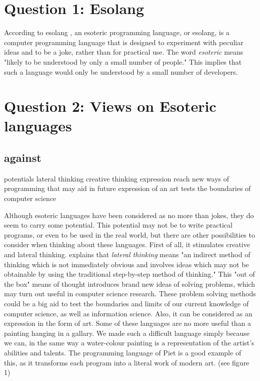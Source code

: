 \documentclass[a4paper]{article}
\begin{document}

\tableofcontents
\newpage

\section{Question 1: Esolang}
According to esolang \cite{esolang}, an esoteric programming language, or esolang, is a computer programming language that is designed to experiment with peculiar ideas and to be a joke, rather than for practical use. The word \textit{esoteric} means "likely to be understood by only a small number of people\cite{wikipedia}." This implies that such a language would only be understood by a small number of developers. 
\section{Question 2: Views on Esoteric languages}
	\subsection{against}
	potentials
		lateral thinking
		creative thinking
		expression
		reach new ways of programming that may aid in future
	expression of an art
	tests the boundaries of computer science
	
	Although esoteric languages have been considered as no more than jokes, they do seem to carry some potential. This potential may not be to write practical programs, or even to be used in the real world, but there are other possibilities to consider when thinking about these languages. First of all, it stimulates creative and lateral thinking. \cite{wikipedia2} explains that \textit{lateral thinking} means "an indirect method of thinking which is not immediately obvious and involves ideas which may not be obtainable by using the traditional step-by-step method of thinking." This "out of the box" means of thought introduces brand new ideas of solving problems, which may turn out useful in computer science research. These problem solving methods could be a big aid to test the boundaries and limits of our current knowledge of computer science, as well as information science.
\newline
\newline	
	Also, it can be considered as an expression in the form of art\cite{esolangArt}. Some of these languages are no more useful than a painting hanging in a gallary. We made such a difficult language simply because we can, in the same way a water-colour painting is a representation of the artist's abilities and talents. The programming language of Piet is a good example of this, as it transforms each program into a literal work of modern art. (see figure 1)
	
\end{document}
